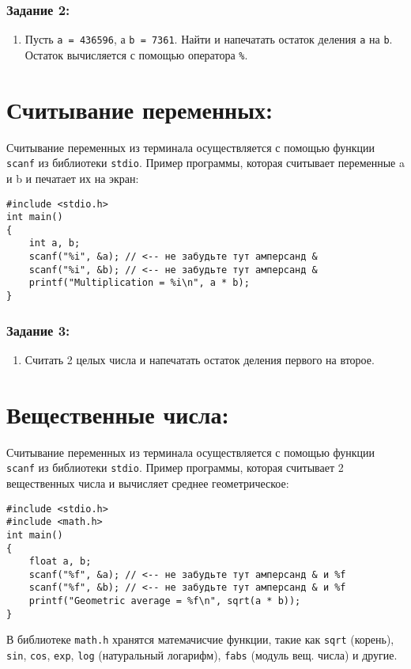 \documentclass{article}
\begin{document}
\subsubsection*{Задание 2:}
\begin{enumerate}
\item Пусть \texttt{a = 436596}, а \texttt{b = 7361}. Найти и напечатать остаток деления \texttt{a} на \texttt{b}. Остаток вычисляется с помощью оператора \texttt{\%}.
\end{enumerate}

\section*{Считывание переменных:}
Считывание переменных из терминала осуществляется с помощью функции \texttt{scanf} из библиотеки \texttt{stdio}.
Пример программы, которая считывает переменные a и b и печатает их на экран:
\begin{lstlisting}
#include <stdio.h>
int main() 
{
    int a, b;
    scanf("%i", &a); // <-- не забудьте тут амперсанд &
    scanf("%i", &b); // <-- не забудьте тут амперсанд &
    printf("Multiplication = %i\n", a * b);
}
\end{lstlisting}
\subsubsection*{Задание 3:}
\begin{enumerate}
\item Считать 2 целых числа и напечатать остаток деления первого на второе.
\end{enumerate}



\section*{Вещественные числа:}
Считывание переменных из терминала осуществляется с помощью функции \texttt{scanf} из библиотеки \texttt{stdio}.
Пример программы, которая считывает 2 вещественных числа и вычисляет среднее геометрическое:
\begin{lstlisting}
#include <stdio.h>
#include <math.h>
int main() 
{
    float a, b;
    scanf("%f", &a); // <-- не забудьте тут амперсанд & и %f
    scanf("%f", &b); // <-- не забудьте тут амперсанд & и %f
    printf("Geometric average = %f\n", sqrt(a * b));
}
\end{lstlisting}
В библиотеке \texttt{math.h} хранятся матемачисчие функции, такие как \texttt{sqrt} (корень), \texttt{sin}, \texttt{cos}, \texttt{exp}, \texttt{log} (натуральный логарифм), \texttt{fabs} (модуль вещ. числа) и другие. 
\end{document}

